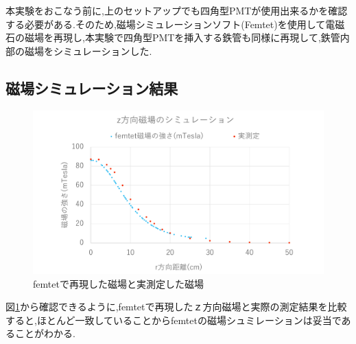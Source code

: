 本実験をおこなう前に,上のセットアップでも四角型PMTが使用出来るかを確認する必要がある.そのため,磁場シミュレーションソフト(Femtet)を使用して電磁石の磁場を再現し,本実験で四角型PMTを挿入する鉄管も同様に再現して,鉄管内部の磁場をシミュレーションした.

\subsection{磁場シミュレーション結果}
\begin{figure}[h]
	\centering
		\includegraphics[width=16cm]{fig/iguchi/magnetgraph2.pdf}
	\caption{femtetで再現した磁場と実測定した磁場}
	\label{magnetgraph2}
\end{figure}

図\ref{magnetgraph2}から確認できるように,femtetで再現した$ｚ$方向磁場と実際の測定結果を比較すると,ほとんど一致していることからfemtetの磁場シュミレーションは妥当であることがわかる.

